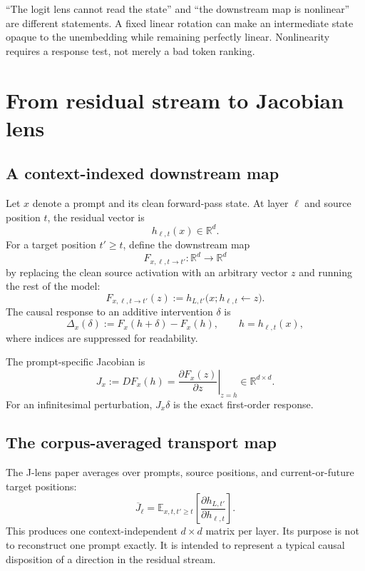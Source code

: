 \documentclass[11pt]{article}
\newcommand{\R}{\mathbb{R}}
\newcommand{\E}{\mathbb{E}}
\newcommand{\Jbar}{\overline{J}}
\theoremstyle{definition}
\theoremstyle{remark}
\begin{document}
\begin{pitfallbox}
``The logit lens cannot read the state'' and ``the downstream map is nonlinear'' are different statements. A fixed linear rotation can make an intermediate state opaque to the unembedding while remaining perfectly linear. Nonlinearity requires a response test, not merely a bad token ranking.
\end{pitfallbox}

\section{From residual stream to Jacobian lens}

\subsection{A context-indexed downstream map}
Let $x$ denote a prompt and its clean forward-pass state. At layer $\ell$ and source position $t$, the residual vector is
\[
  h_{\ell,t}(x) \in \R^d.
\]
For a target position $t'\ge t$, define the downstream map
\[
  F_{x,\ell,t\rightarrow t'}: \R^d \rightarrow \R^d
\]
by replacing the clean source activation with an arbitrary vector $z$ and running the rest of the model:
\[
  F_{x,\ell,t\rightarrow t'}(z)
  := h_{L,t'}\bigl(x; h_{\ell,t}\leftarrow z\bigr).
\]
The causal response to an additive intervention $\delta$ is
\begin{equation}
  \Delta_x(\delta)
  := F_x(h+\delta)-F_x(h),
  \qquad h=h_{\ell,t}(x),
  \label{eq:delta}
\end{equation}
where indices are suppressed for readability.

The prompt-specific Jacobian is
\begin{equation}
  J_x := D F_x(h)
  = \left.\frac{\partial F_x(z)}{\partial z}\right|_{z=h}
  \in \R^{d\times d}.
  \label{eq:promptJ}
\end{equation}
For an infinitesimal perturbation, $J_x\delta$ is the exact first-order response.

\subsection{The corpus-averaged transport map}
The J-lens paper averages over prompts, source positions, and current-or-future target positions:
\begin{equation}
  \Jbar_\ell
  = \E_{x,t,t'\ge t}\left[
    \frac{\partial h_{L,t'}}{\partial h_{\ell,t}}
  \right].
  \label{eq:meanJ}
\end{equation}
This produces one context-independent $d\times d$ matrix per layer. Its purpose is not to reconstruct one prompt exactly. It is intended to represent a typical causal disposition of a direction in the residual stream.
\end{document}
